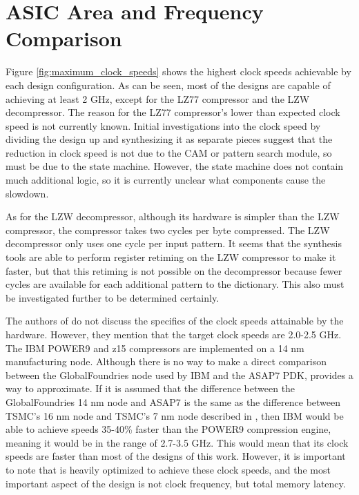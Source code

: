 \documentclass[doublespace,nopageskip]{VTthesis}
\begin{document}
\section{ASIC Area and Frequency Comparison}\label{se:asic_area_and_frequency_comparison}
Figure \ref{fig:maximum_clock_speeds} shows the highest clock speeds achievable by each design configuration. As can be seen, most of the designs are capable of achieving at least 2 GHz, except for the LZ77 compressor and the LZW decompressor. The reason for the LZ77 compressor's lower than expected clock speed is not currently known. Initial investigations into the clock speed by dividing the design up and synthesizing it as separate pieces suggest that the reduction in clock speed is not due to the CAM or pattern search module, so must be due to the state machine. However, the state machine does not contain much additional logic, so it is currently unclear what components cause the slowdown.

As for the LZW decompressor, although its hardware is simpler than the LZW compressor, the compressor takes two cycles per byte compressed. The LZW decompressor only uses one cycle per input pattern. It seems that the synthesis tools are able to perform register retiming on the LZW compressor to make it faster, but that this retiming is not possible on the decompressor because fewer cycles are available for each additional pattern to the dictionary. This also must be investigated further to be determined certainly.

The authors of \cite{ibm} do not discuss the specifics of the clock speeds attainable by the hardware. However, they mention that the target clock speeds are 2.0-2.5 GHz. The IBM POWER9 and z15 compressors are implemented on a 14 nm manufacturing node. Although there is no way to make a direct comparison between the GlobalFoundries node used by IBM and the ASAP7 PDK, \cite{wikichip-manufacturing-conversion} provides a way to approximate. If it is assumed that the difference between the GlobalFoundries 14 nm node and ASAP7 is the same as the difference between TSMC's 16 nm node and TSMC's 7 nm node described in \cite{wikichip-manufacturing-conversion}, then IBM would be able to achieve speeds 35-40\% faster than the POWER9 compression engine, meaning it would be in the range of 2.7-3.5 GHz. This would mean that its clock speeds are faster than most of the designs of this work. However, it is important to note that \cite{ibm} is heavily optimized to achieve these clock speeds, and the most important aspect of the design is not clock frequency, but total memory latency.
\end{document}
